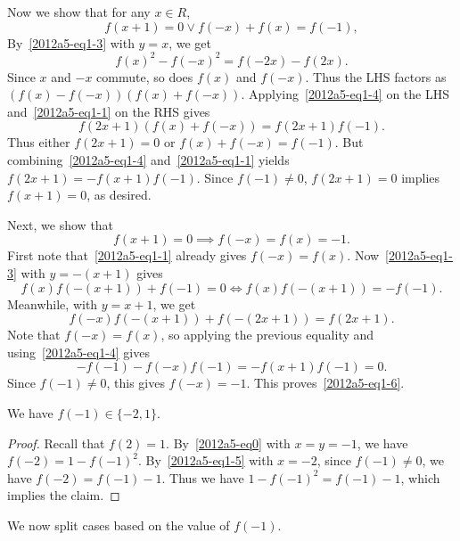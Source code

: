 Now we show that for any $x \in R$,
\[ f(x + 1) = 0 \vee f(-x) + f(x) = f(-1), \tag{1.5}\label{2012a5-eq1-5} \]
By~\eqref{2012a5-eq1-3} with $y = x$, we get
\[ f(x)^2 - f(-x)^2 = f(-2x) - f(2x). \]
Since $x$ and $-x$ commute, so does $f(x)$ and $f(-x)$.
Thus the LHS factors as $(f(x) - f(-x))(f(x) + f(-x))$.
Applying~\eqref{2012a5-eq1-4} on the LHS and~\eqref{2012a5-eq1-1} on the RHS gives
\[ f(2x + 1) (f(x) + f(-x)) = f(2x + 1) f(-1). \]
Thus either $f(2x + 1) = 0$ or $f(x) + f(-x) = f(-1)$.
But combining~\eqref{2012a5-eq1-4} and~\eqref{2012a5-eq1-1} yields $f(2x + 1) = -f(x + 1) f(-1)$.
Since $f(-1) \neq 0$, $f(2x + 1) = 0$ implies $f(x + 1) = 0$, as desired.

Next, we show that
\[ f(x + 1) = 0 \implies f(-x) = f(x) = -1. \tag{1.6}\label{2012a5-eq1-6} \]
First note that~\eqref{2012a5-eq1-1} already gives $f(-x) = f(x)$.
Now~\eqref{2012a5-eq1-3} with $y = -(x + 1)$ gives
\[ f(x) f(-(x + 1)) + f(-1) = 0 \iff f(x) f(-(x + 1)) = -f(-1). \]
Meanwhile, with $y = x + 1$, we get
\[ f(-x) f(-(x + 1)) + f(-(2x + 1)) = f(2x + 1). \]
Note that $f(-x) = f(x)$, so applying the previous equality and using~\eqref{2012a5-eq1-4} gives
\[ -f(-1) - f(-x) f(-1) = -f(x + 1) f(-1) = 0. \]
Since $f(-1) \neq 0$, this gives $f(-x) = -1$.
This proves~\eqref{2012a5-eq1-6}.

\begin{claim}
We have $f(-1) \in \{-2, 1\}$.
\end{claim}
\begin{proof}
Recall that $f(2) = 1$.
By~\eqref{2012a5-eq0} with $x = y = -1$, we have $f(-2) = 1 - f(-1)^2$.
By~\eqref{2012a5-eq1-5} with $x = -2$, since $f(-1) \neq 0$, we have $f(-2) = f(-1) - 1$.
Thus we have $1 - f(-1)^2 = f(-1) - 1$, which implies the claim.
\end{proof}

We now split cases based on the value of $f(-1)$.

